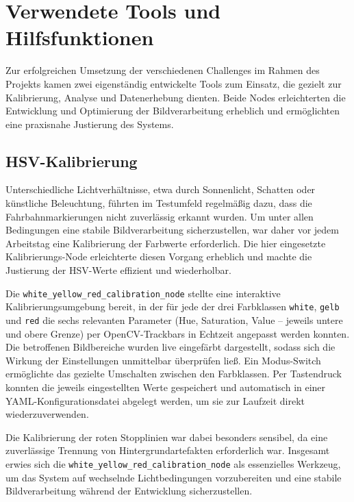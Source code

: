 \chapter{Verwendete Tools und Hilfsfunktionen}
\label{ch:Tools}

Zur erfolgreichen Umsetzung der verschiedenen Challenges im Rahmen des Projekts kamen zwei eigenständig entwickelte Tools zum Einsatz, die gezielt zur Kalibrierung, Analyse und Datenerhebung dienten. Beide Nodes erleichterten die Entwicklung und Optimierung der Bildverarbeitung erheblich und ermöglichten eine praxisnahe Justierung des Systems.

\section{HSV-Kalibrierung}

Unterschiedliche Lichtverhältnisse, etwa durch Sonnenlicht, Schatten oder künstliche Beleuchtung, führten im Testumfeld regelmäßig dazu, dass die Fahrbahnmarkierungen nicht zuverlässig erkannt wurden. Um unter allen Bedingungen eine stabile Bildverarbeitung sicherzustellen, war daher vor jedem Arbeitstag eine Kalibrierung der Farbwerte erforderlich. Die hier eingesetzte Kalibrierungs-Node erleichterte diesen Vorgang erheblich und machte die Justierung der HSV-Werte effizient und wiederholbar.

Die \texttt{white\_yellow\_red\_calibration\_node} stellte eine interaktive Kalibrierungsumgebung bereit, in der für jede der drei Farbklassen \texttt{white}, \texttt{gelb} und \texttt{red} die sechs relevanten Parameter (Hue, Saturation, Value – jeweils untere und obere Grenze) per OpenCV-Trackbars in Echtzeit angepasst werden konnten. Die betroffenen Bildbereiche wurden live eingefärbt dargestellt, sodass sich die Wirkung der Einstellungen unmittelbar überprüfen ließ. Ein Modus-Switch ermöglichte das gezielte Umschalten zwischen den Farbklassen. Per Tastendruck konnten die jeweils eingestellten Werte gespeichert und automatisch in einer YAML-Konfigurationsdatei abgelegt werden, um sie zur Laufzeit direkt wiederzuverwenden.

Die Kalibrierung der roten Stopplinien war dabei besonders sensibel, da eine zuverlässige Trennung von Hintergrundartefakten erforderlich war. Insgesamt erwies sich die \texttt{white\_yellow\_red\_calibration\_node} als essenzielles Werkzeug, um das System auf wechselnde Lichtbedingungen vorzubereiten und eine stabile Bildverarbeitung während der Entwicklung sicherzustellen.

